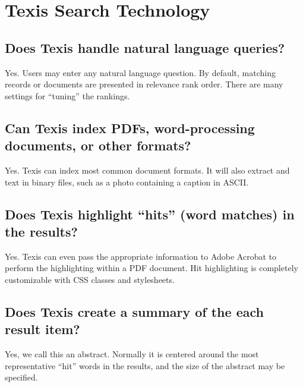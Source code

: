 \chapter{Texis Search Technology }

\section{Does Texis handle natural language queries? }

Yes. Users may enter any natural language question. By default,
matching records or documents are presented in relevance rank
order. There are many settings for ``tuning'' the rankings.

\section{Can Texis index PDFs, word-processing documents, or other formats? }

Yes. Texis can index most common document formats.  It will also
extract and text in binary files, such as a photo containing a caption
in ASCII.

\section{Does Texis highlight ``hits'' (word matches) in the results? }

Yes. Texis can even pass the appropriate information to Adobe Acrobat
to perform the highlighting within a PDF document.  Hit highlighting
is completely customizable with CSS classes and stylesheets.

\section{Does Texis create a summary of the each result item? }

Yes, we call this an abstract.  Normally it is centered around the
most representative ``hit'' words in the results, and the size of the
abstract may be specified.

